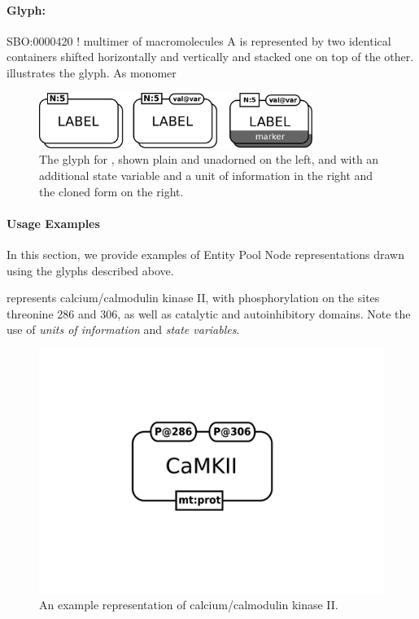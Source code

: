 \paragraph{Glyph: }

\begin{glyphDescription}
\glyphSboTerm SBO:0000420 ! multimer of macromolecules
\glyphContainer A  is represented by two identical containers shifted horizontally and vertically and stacked one on top of the other.   illustrates the glyph.
\glyphLabel As monomer
\end{glyphDescription}

\begin{figure}[H]
  \centering
  \includegraphics[width = 3.5in]{images/macromolMultimer}
  \caption{The \PD glyph for , shown plain and
    unadorned on the left, and with an additional state variable and a
    unit of information in the right and the cloned form on the right.}
  \label{fig:macromolMultimer}
\end{figure}

\paragraph{Usage Examples}
\label{sec:CplxEPNs}

In this section, we provide examples of Entity Pool Node representations drawn using the \SBGNPDLone glyphs described above. 

 represents calcium/calmodulin kinase II, with phosphorylation on the sites threonine 286 and 306, as well as catalytic and autoinhibitory domains.  Note the use of \emph{units of information} and \emph{state variables}.

\begin{figure}[H]
  \centering
  \includegraphics[scale = 0.3]{examples/macromolecule-CaMKII}
  \caption{An example representation of calcium/calmodulin kinase II.}
  \label{fig:example-camkii}
\end{figure}

